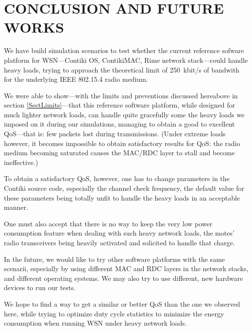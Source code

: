 \documentclass[a4paper,twoside]{article}
\begin{document}

\section{\uppercase{Conclusion and Future Works}}

We have build simulation scenarios to test whether the current reference
sofware platform for WSN---Contiki OS, ContikiMAC, Rime network
stack---could handle heavy loads, trying to approach the theoretical
limit of 250~kbit/s of bandwith for the underlying IEEE 802.15.4
radio medium.

We were able to show---with the limits and preventions discussed hereabove
in section \ref{SectLimits}---that this reference software platform, while
designed for much lighter network loads, can handle quite gracefully some
the heavy loads we imposed on it during our simulations, managing to obtain
a good to excellent QoS---that is: few packets lost during transmissions.
(Under extreme loads however, it becomes impossible to obtain satisfactory
results for QoS: the radio medium becoming saturated causes the MAC/RDC
layer to stall and become ineffective.)

To obtain a satisfactory QoS, however, one has to change parameters in
the Contiki source code, especially the channel check frequency, the default
value for these parameters being totally unfit to handle the heavy loads
in an acceptable manner.

One must also accept that there is no way to keep the very low power
consumption feature when dealing with such heavy network loads, the
motes' radio transceivers being heavily activated and solicited to
handle that charge.

\medskip

In the future, we would like to try other software platforms with the same
scenarii, especially by using different MAC and RDC layers in the network
stacks, and different operating systems. We may also try to use different,
new hardware devices to run our tests.

We hope to find a way to get a similar or better QoS than the one we observed
here, while trying to optimize duty cycle statistics to minimize the energy
consumption when running WSN under heavy network loads.




\vfill

{\small
}
\end{document}
